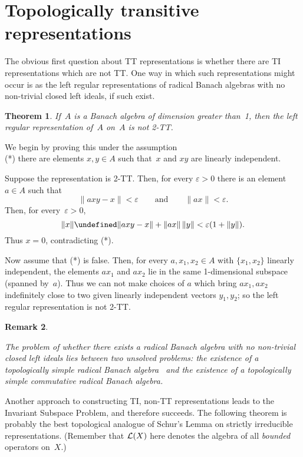 \documentclass[11pt]{article}
\let\leq\undefined  \let\geq\undefined
\let\le\leq   \let\ge\geq
\newcommand{\e}{\varepsilon}
\newtheorem{thm}{Theorem}[section]
\newenvironment{Proof}{{\it Proof. }}{}%
\newtheorem{remk}[thm]{Remark}
\newenvironment{Remark}{\begin{remk}\begin{rm}}{\end{rm}\end{remk}}
\newcommand{\detail}[1]{}
\newcommand{\LX}{{\cal L}(X)}
\begin{document}
\section{Topologically transitive representations}\label{S4a}

The obvious first question about TT representations is whether there are
TI representations which are not TT.   One way in which such representations
might occur is as the left regular representations of radical Banach algebras
with no non-trivial closed left ideals, if such exist.

\begin{thm}\label{T0}
If~$A$ is a Banach algebra of dimension greater than~1, then the left regular
representation of~$A$ on~$A$ is not 2-TT.
\end{thm}

\begin{Proof}
We begin by proving this under the assumption\\
(*) there are elements $x,y \in A$ such that~$x$ and $xy$ are linearly
independent.

Suppose the representation is 2-TT.  Then, for every
$\e > 0$ there is an element $a \in A$ such that
$$\|axy - x\| < \e\qquad \mbox{and} \qquad \|ax\| < \e.$$
Then, for every~$\e>0$,
$$\|x\| \le \|axy - x\| + \|ax\|\,\|y\| < \e(1+\|y\|).$$
Thus $x=0$, contradicting (*).

Now assume that (*) is false.   Then, for every $a,x_1,x_2 \in A$ with
$\{x_1,x_2\}$ linearly independent, the elements $ax_1$ and $ax_2$ lie in the
same 1-dimensional subspace (spanned by~$a$).  Thus we can not make choices of
$a$ which bring $ax_1, ax_2$ indefinitely close to two given linearly
independent vectors $y_1,y_2$; so the left regular representation is not 2-TT.
\end{Proof}

\begin{Remark}
The problem of whether there exists a radical Banach algebra with no non-trivial
closed left ideals lies between two unsolved problems: the existence of a
topologically simple radical Banach algebra \detail{no non-trivial closed
two-sided ideals}\ and the existence of a topologically simple commutative
radical Banach algebra.  \detail{Might it be equivalent to one of these questions?}
\end{Remark}

Another approach to constructing TI, non-TT representations
leads to the Invariant Subspace Problem, and therefore succeeds.
The following theorem is probably the best topological analogue of Schur's Lemma
on strictly irreducible representations.    (Remember that $\LX$ here denotes
the algebra of all {\em bounded} operators on~$X$.)
\end{document}
